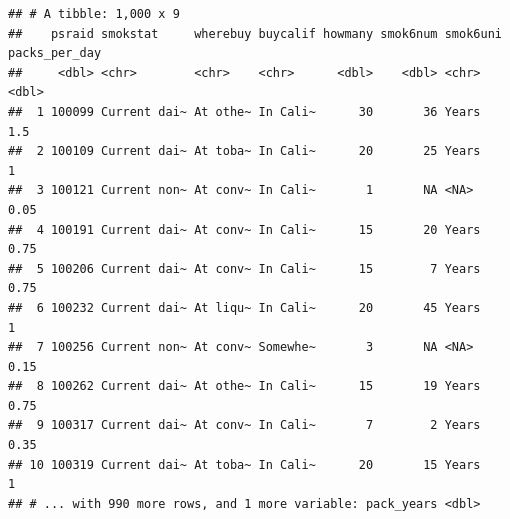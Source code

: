 \documentclass[
]{article}
\newenvironment{Shaded}{\begin{snugshade}}{\end{snugshade}}
\newcommand{\AttributeTok}[1]{\textcolor[rgb]{0.77,0.63,0.00}{#1}}
\newcommand{\CommentTok}[1]{\textcolor[rgb]{0.56,0.35,0.01}{\textit{#1}}}
\newcommand{\DecValTok}[1]{\textcolor[rgb]{0.00,0.00,0.81}{#1}}
\newcommand{\FunctionTok}[1]{\textcolor[rgb]{0.00,0.00,0.00}{#1}}
\newcommand{\NormalTok}[1]{#1}
\newcommand{\OtherTok}[1]{\textcolor[rgb]{0.56,0.35,0.01}{#1}}
\newcommand{\SpecialCharTok}[1]{\textcolor[rgb]{0.00,0.00,0.00}{#1}}
\newcommand{\StringTok}[1]{\textcolor[rgb]{0.31,0.60,0.02}{#1}}
\begin{document}
\begin{Shaded}
\end{Shaded}

\begin{verbatim}
## # A tibble: 1,000 x 9
##    psraid smokstat     wherebuy buycalif howmany smok6num smok6uni packs_per_day
##     <dbl> <chr>        <chr>    <chr>      <dbl>    <dbl> <chr>            <dbl>
##  1 100099 Current dai~ At othe~ In Cali~      30       36 Years             1.5 
##  2 100109 Current dai~ At toba~ In Cali~      20       25 Years             1   
##  3 100121 Current non~ At conv~ In Cali~       1       NA <NA>              0.05
##  4 100191 Current dai~ At conv~ In Cali~      15       20 Years             0.75
##  5 100206 Current dai~ At conv~ In Cali~      15        7 Years             0.75
##  6 100232 Current dai~ At liqu~ In Cali~      20       45 Years             1   
##  7 100256 Current non~ At conv~ Somewhe~       3       NA <NA>              0.15
##  8 100262 Current dai~ At othe~ In Cali~      15       19 Years             0.75
##  9 100317 Current dai~ At conv~ In Cali~       7        2 Years             0.35
## 10 100319 Current dai~ At toba~ In Cali~      20       15 Years             1   
## # ... with 990 more rows, and 1 more variable: pack_years <dbl>
\end{verbatim}
\end{document}
